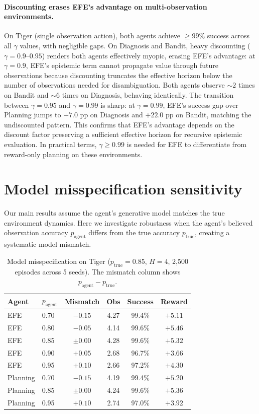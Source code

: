 \documentclass[runningheads]{llncs}
\begin{document}
\paragraph{Discounting erases EFE's advantage on multi-observation environments.} On Tiger (single observation action), both agents achieve ${\geq}99\%$ success across all $\gamma$ values, with negligible gaps. On Diagnosis and Bandit, heavy discounting ($\gamma{=}0.9$--$0.95$) renders both agents effectively myopic, erasing EFE's advantage: at $\gamma{=}0.9$, EFE's epistemic term cannot propagate value through future observations because discounting truncates the effective horizon below the number of observations needed for disambiguation. Both agents observe ${\sim}2$ times on Bandit and ${\sim}6$ times on Diagnosis, behaving identically. The transition between $\gamma{=}0.95$ and $\gamma{=}0.99$ is sharp: at $\gamma{=}0.99$, EFE's success gap over Planning jumps to $+7.0$ pp on Diagnosis and $+22.0$ pp on Bandit, matching the undiscounted pattern. This confirms that EFE's advantage depends on the discount factor preserving a sufficient effective horizon for recursive epistemic evaluation. In practical terms, $\gamma \geq 0.99$ is needed for EFE to differentiate from reward-only planning on these environments.

\section{Model misspecification sensitivity}
\label{app:misspec}

Our main results assume the agent's generative model matches the true environment dynamics. Here we investigate robustness when the agent's believed observation accuracy $p_{\text{agent}}$ differs from the true accuracy $p_{\text{true}}$, creating a systematic model mismatch.

\begin{table}[h]
\centering
\caption{Model misspecification on Tiger ($p_{\text{true}}{=}0.85$, $H{=}4$, 2{,}500 episodes across 5 seeds). The mismatch column shows $p_{\text{agent}} - p_{\text{true}}$.}
\label{tab:misspec-tiger}
\begin{small}
\begin{tabular}{llcccc}
\toprule
Agent & $p_{\text{agent}}$ & Mismatch & Obs & Success & Reward \\
\midrule
EFE & 0.70 & $-0.15$ & 4.27 & 99.4\% & $+5.11$ \\
EFE & 0.80 & $-0.05$ & 4.14 & 99.6\% & $+5.46$ \\
EFE & 0.85 & $\pm 0.00$ & 4.28 & 99.6\% & $+5.32$ \\
EFE & 0.90 & $+0.05$ & 2.68 & 96.7\% & $+3.66$ \\
EFE & 0.95 & $+0.10$ & 2.66 & 97.2\% & $+4.30$ \\
\midrule
Planning & 0.70 & $-0.15$ & 4.19 & 99.4\% & $+5.20$ \\
Planning & 0.85 & $\pm 0.00$ & 4.24 & 99.6\% & $+5.36$ \\
Planning & 0.95 & $+0.10$ & 2.74 & 97.0\% & $+3.92$ \\
\bottomrule
\end{tabular}
\end{small}
\end{table}
\end{document}
